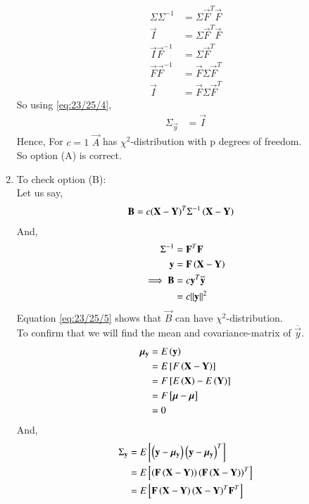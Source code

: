 \documentclass[journal,12pt,onecolumn]{IEEEtran}
\theoremstyle{remark}
\begin{document}
\begin{enumerate}[label=(\alph*)]
\begin{align}
\Sigma{\Sigma}^{-1} &= \Sigma{\vec{F}}^T\vec{F} \\
\vec{I} &= \Sigma{\vec{F}}^T\vec{F} \\
\vec{I}{\vec{F}}^{-1} &= \Sigma{\vec{F}}^T \\
\vec{F}{\vec{F}}^{-1} &= \vec{F}\Sigma{\vec{F}}^T \\
\vec{I} &= \vec{F}\Sigma{\vec{F}}^T    \label{eq:23/25/4}
\end{align}
So using \eqref{eq:23/25/4},
\begin{align}
{\Sigma}_{\vec{y}} &= \vec{I}
\end{align}
Hence, For $c=1$ $\vec{A}$ has ${\chi}^2$-distribution with p degrees of freedom. \\
So option (A) is correct.
\item To check option (B): \\
Let us say,
\begin{align}
\mathbf{B} &= c{\left(\mathbf{X}-\mathbf{Y}\right)^T}{\Sigma}^{-1}\left(\mathbf{X}-\mathbf{Y}\right)
\end{align}
And,
\begin{align}
{\Sigma}^{-1} &= {\mathbf{F}}^T\mathbf{F}  \\
\mathbf{y} &= \mathbf{F}\left(\mathbf{X}-\mathbf{Y}\right) \\
\implies \mathbf{B} &= c{\mathbf{y}}^T\overline{\mathbf{y}} \\
                 &= c{\left\lVert\mathbf{y}\right\rVert}^2  \label{eq:23/25/5}
\end{align}
Equation \eqref{eq:23/25/5} shows that $\vec{B}$ can have ${\chi}^2$-distribution. \\
To confirm that we will find the mean and covariance-matrix of $\overline{\vec{y}}$.
\begin{align}
{\bm{\mu}}_{\mathbf{y}} &= E\left(\mathbf{y}\right) \\
                     &= E{}\left[F\left(\mathbf{X}-\mathbf{Y}\right)\right] \\
                     &= F{}\left[E\left(\mathbf{X}\right)-E\left(\mathbf{Y}\right)\right] \\
                     &= F{}\left[\bm{\mu}-\bm{\mu}\right] \\
                     &= 0
\end{align}
And,
\begin{align}
{\Sigma}_{\vec{y}} &= E\sbrak{\brak{\vec{y}-{\bm{\mu}}_{\vec{y}}}{\brak{\vec{y}-{\bm{\mu}}_{\vec{y}}}}^T} \\
                   &= E\sbrak{\brak{\vec{F}\brak{\vec{X}-\vec{Y}}}{\brak{\vec{F}\brak{\vec{X}-\vec{Y}}}}^T} \\
                   &= E\sbrak{\vec{F}\brak{\vec{X}-\vec{Y}}{\brak{\vec{X}-\vec{Y}}}^T{\vec{F}}^T} \\

\end{align}
\end{enumerate}
\end{document}
